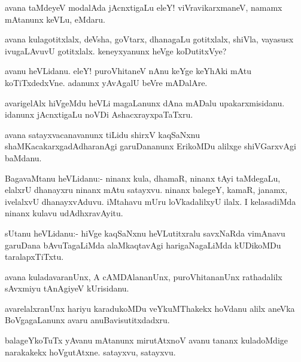 \begin{mng}
avana taMdeyeV modalAda jAcnxtigaLu eleY! viVravikarxmaneV, namamx mAtanunx keVLu, eMdaru.
\end{mng}

\begin{mng}
avana kulagotitxlalx, deVsha, goVtarx, dhanagaLu gotitxlalx, shiVla, vayasusx ivugaLAvuvU gotitxlalx. keneyxyanunx heVge koDutitxVye?
\end{mng}

\begin{mng}
avanu heVLidanu. eleY! puroVhitaneV nAnu keYge keYhAki mAtu koTiTxdedxVne. adanunx yAvAgalU beVre mADalAre.
\end{mng}

\begin{mng}
avarigelAlx hiVgeMdu heVLi magaLanunx dAna mADalu upakarxmisidanu. idanunx jAcnxtigaLu noVDi AshacxrayxpaTaTxru.
\end{mng}

\begin{mng}
avana satayxvacanavanunx tiLidu shirxV kaqSaNxnu shaMKacakarxgadAdharanAgi garuDananunx ErikoMDu alilxge shiVGarxvAgi baMdanu.
\end{mng}

\begin{mng}
BagavaMtanu heVLidanu:- ninanx kula, dhamaR, ninanx tAyi taMdegaLu, elalxrU dhanayxru ninanx mAtu satayxvu. ninanx balegeY, kamaR, janamx, ivelalxvU dhanayxvAduvu. iMtahavu mUru loVkadalilxyU ilalx. I kelasadiMda ninanx kulavu udAdhxravAyitu.
\end{mng}

\begin{mng}
sUtanu heVLidanu:- hiVge kaqSaNxnu heVLutitxralu savxNaRda vimAnavu garuDana bAvuTagaLiMda alaMkaqtavAgi harigaNagaLiMda kUDikoMDu taralapxTiTxtu.
\end{mng}

\begin{mng}
avana kuladavaranUnx, A cAMDAlananUnx, puroVhitananUnx rathadalilx sAvxmiyu tAnAgiyeV kUrisidanu.
\end{mng}

\begin{mng}
avarelalxranUnx hariyu karadukoMDu veYkuMThakekx hoVdanu alilx aneVka BoVgagaLanunx avaru anuBavisutitxdadxru.
\end{mng}

\begin{mng}
balageYkoTuTx yAvanu mAtanunx mirutAtxnoV avanu tananx kuladoMdige narakakekx hoVgutAtxne. satayxvu, satayxvu.
\end{mng}

